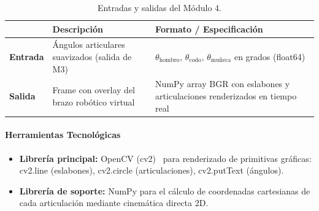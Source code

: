 \begin{table}[h!]
\centering
\label{tab:m1_io}
\renewcommand{\arraystretch}{1.3}
\begin{tabularx}{\textwidth}{
    >{\bfseries}p{3cm}
    X
    X
}    
\toprule
&
\textbf{Descripción} &
\textbf{Formato / Especificación} \\
\midrule
Entrada &
  Ángulos articulares suavizados (salida de M3) &
  $\theta_{\text{hombro}},\,\theta_{\text{codo}},\,
   \theta_{\text{muñeca}}$ en grados (float64) \\
\midrule
Salida &
  Frame con overlay del brazo robótico virtual &
  NumPy array BGR con eslabones y articulaciones renderizados
  en tiempo real \\
\bottomrule
\end{tabularx}
\caption{Entradas y salidas del Módulo 4.}
\end{table}
 
\paragraph{Herramientas Tecnológicas}
\begin{itemize}[leftmargin=1.5em]
  \item \textbf{Librería principal:}
        OpenCV (cv2)~\cite{Bradski2000} para renderizado
        de primitivas gráficas: cv2.line (eslabones),
        cv2.circle (articulaciones),
        cv2.putText (ángulos).
  \item \textbf{Librería de soporte:} NumPy para el cálculo
        de coordenadas cartesianas de cada articulación mediante
        cinemática directa 2D.
\end{itemize}

